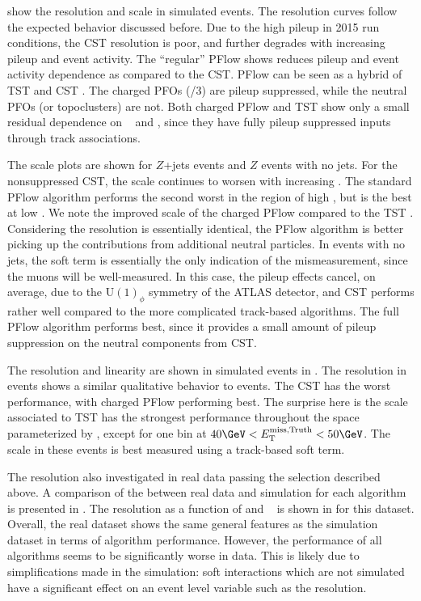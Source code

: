  show the resolution and scale in simulated \Zmm events.
The resolution curves follow the expected behavior discussed before.
Due to the high pileup in 2015 run conditions, the CST \met resolution is poor, and further degrades with increasing pileup and event activity.
The ``regular'' PFlow \met shows reduces pileup and event activity dependence as compared to the CST.
PFlow \met can be seen as a hybrid of TST \met and CST \met.
The charged PFOs (/3) are pileup suppressed, while the neutral PFOs (or topoclusters) are not.
Both charged PFlow and TST \met show only a small residual dependence on \npv~ and \sumET, since they have fully pileup suppressed inputs through track associations.

The scale plots are shown for $Z$+jets events and $Z$ events with no jets.
For the nonsuppressed CST, the scale continues to worsen with increasing \ptZ.
The standard PFlow algorithm performs the second worst in the region of high \ptZ, but is the best at low \ptZ.
We note the improved scale of the charged PFlow \met compared to the TST \met.
Considering the resolution is essentially identical, the PFlow algorithm is better picking up the contributions from additional neutral particles.
In events with no jets, the soft term is essentially the only indication of the \met mismeasurement, since the muons will be well-measured.
In this case, the pileup effects cancel, on average, due to the U$(1)_\phi$ symmetry of the ATLAS detector, and CST performs rather well compared to the more complicated track-based algorithms.
The full PFlow algorithm performs best, since it provides a small amount of pileup suppression on the neutral components from CST.

The resolution and linearity are shown in simulated \Wen events in .
The resolution in \Wen events shows a similar qualitative behavior to \Zmm events.
The CST \met has the worst performance, with charged PFlow \met performing best.
The surprise here is the scale associated to TST \met has the strongest performance throughout the space parameterized by \mettrue, except for one bin at $40 \GeV < \mettrue < 50 \GeV$.
The scale in these events is best measured using a track-based soft term.

The resolution also investigated in real data passing the \Zmm selection described above.
A comparison of the \met between real data and simulation for each algorithm is presented in .
The resolution as a function of \sumET and \npv~ is shown in  for this dataset.
Overall, the real dataset shows the same general features as the simulation dataset in terms of algorithm performance.
However, the performance of all algorithms seems to be significantly worse in data.
This is likely due to simplifications made in the simulation: soft interactions which are not simulated have a significant effect on an event level variable such as the \met resolution.

